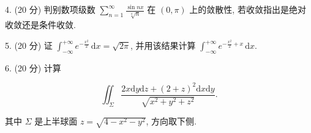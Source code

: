 \documentclass{examcollection}
\renewcommand{\displayformula}[1]{\[#1\]}
\begin{document}
{\begin{minipage}{\textwidth}
4. (20 分) 判别数项级数 $\sum_{n=1}^{\infty} \frac{\sin nx}{\sqrt[4]{n}}$ 在 $(0, \pi)$ 上的敛散性, 若收敛指出是绝对收敛还是条件收敛.\par
5. (20 分) 证 $\int_{-\infty}^{+\infty} e^{-\frac{x^2}{2}} \, \mathrm{d}x = \sqrt{2\pi}$, 并用该结果计算 $\int_{-\infty}^{+\infty} e^{-\frac{x^2}{2} + x} \, \mathrm{d}x$.\par
6. (20 分) 计算\par
\displayformula{\iint_ {\Sigma} \frac {2 x \mathrm{d} y \mathrm{d} z + (2 + z) ^ {2} \mathrm{d} x \mathrm{d} y}{\sqrt {x ^ {2} + y ^ {2} + z ^ {2}}}.}\par
其中 $\Sigma$ 是上半球面 $z = \sqrt{4 - x^2 - y^2}$, 方向取下侧.\par
\end{minipage}}
\ifdim\dimexpr\ht\proofbox+\dp\proofbox\relax>\textheight
\noindent\resizebox{!}{\textheight}{\usebox{\proofbox}}\else\noindent\usebox{\proofbox}\fi\clearpage
\end{document}
